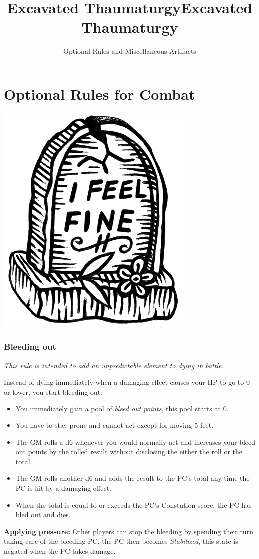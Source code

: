 \documentclass[letterpaper,sansserif,tightsqueeze]{rpg-module}
\title{Excavated Thaumaturgy}
\begin{document}
\twocolumn

\title{Excavated Thaumaturgy}

\subtitle{Optional Rules and Miscellaneous Artifacts}




\maketitle

\vspace{0.5cm}
\part*{Optional Rules for Combat}
\vspace{0.5cm}

\begin{center}
	\includegraphics[width = 0.3\linewidth]{dead.png}
\end{center}
\section{Bleeding out}
\textit{This rule is intended to add an unpredictable element to dying in battle.}

Instead of dying immediately when a damaging effect causes your HP to go to 0 or lower, you start bleeding out:
\begin{itemize}
	\item You immediately gain a pool of \textit{bleed out points}, this pool starts at 0.
	\item You have to stay prone and cannot act except for moving 5 feet.
	\item The GM rolls a d6 whenever you would normally act and increases your bleed out points by the rolled result without disclosing the either the roll or the total.
	\item The GM rolls another d6 and adds the result to the PC's total any time the PC is hit by a damaging effect.
	\item When the total is equal to or exceeds the PC's Constution score, the PC has bled out and dies.
\end{itemize}
\textbf{Applying pressure:} Other players can stop the bleeding by spending their turn taking care of the bleeding PC, the PC then becomes \textit{Stabilized}, this state is negated when the PC takes damage.
\end{document}
